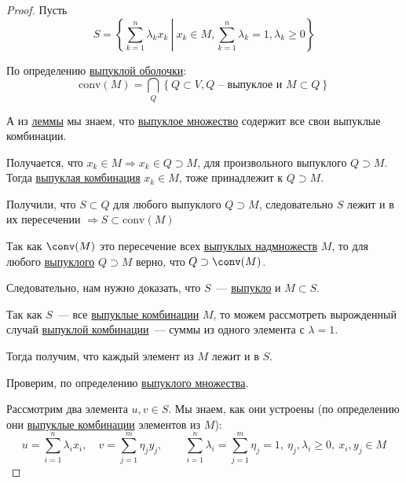 \begin{proof}
  Пусть
  \[
  S = \left\{ \sum\limits_{k=1}^n \lambda_k x_k\  \left| \  x_k \in M, \sum\limits_{k=1}^n \lambda_k = 1, \lambda_k \ge 0\right. \right\}
  \]

  По определению \hyperref[note:1AC657F9-2A3D-47D1-A71D-5B813D961260]{выпуклой оболочки}:
  \[
  \mathrm{conv}(M) = \bigcap_Q \left\{ Q \subset V, Q \text{ -- выпуклое и } M \subset Q \right\}
  \]

  А из \hyperref[note:42DFF6DC-CC9D-40AA-9D6F-218DCF613833]{леммы} мы знаем, что \hyperref[note:316B5BFA-8B9F-4267-9086-D6593AAB5F9B]{выпуклое множество} содержит все свои выпуклые комбинации.

  Получается, что $x_k \in M \Rightarrow x_k \in Q \supset M$, для произвольного выпуклого $Q \supset M$.
  Тогда \hyperref[note:8583F986-A6E8-4BBB-B2FB-BA0E9BBE58BF]{выпуклая комбинация} $x_k \in M$, тоже принадлежит к $Q \supset M$.

  Получили, что $S \subset Q$ для любого выпуклого $Q \supset M$, следовательно $S$ лежит и в их пересечении $\Rightarrow S \subset \mathrm{conv}(M)$

  Так как $\conv(M)$ это пересечение всех \hyperref[note:316B5BFA-8B9F-4267-9086-D6593AAB5F9B]{выпуклых надмножеств} $M$, то для любого
  \hyperref[note:316B5BFA-8B9F-4267-9086-D6593AAB5F9B]{выпуклого} $Q \supset M$ верно, что $Q \supset \conv(M)$.

  Следовательно, нам нужно доказать, что $S$~--- \hyperref[note:316B5BFA-8B9F-4267-9086-D6593AAB5F9B]{выпукло} и $M \subset S$.

  Так как $S$~--- все \hyperref[note:8583F986-A6E8-4BBB-B2FB-BA0E9BBE58BF]{выпуклые комбинации} $M$, то можем рассмотреть вырожденный случай \hyperref[note:8583F986-A6E8-4BBB-B2FB-BA0E9BBE58BF]{выпуклой комбинации}~--- суммы из одного элемента с $\lambda =1$.

  Тогда получим, что каждый элемент из $M$ лежит и в $S$.

  Проверим, по определению \hyperref[note:316B5BFA-8B9F-4267-9086-D6593AAB5F9B]{выпуклого множества}.

  Рассмотрим два элемента $u,v \in S$. Мы знаем, как они устроены (по определению они \hyperref[note:8583F986-A6E8-4BBB-B2FB-BA0E9BBE58BF]{выпуклые комбинации} элементов из $M$):
  \[
  u = \sum\limits_{i=1}^n \lambda_i x_i,\quad v = \sum\limits_{j=1}^m \eta_jy_j,\qquad
  \sum\limits_{i=1}^n \lambda_i = \sum\limits_{j=1}^m \eta_j = 1,\ \eta_j, \lambda_i \ge 0,\ x_i,y_j \in M
  \]


\end{proof}
